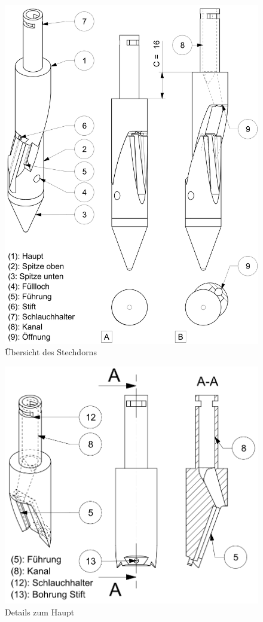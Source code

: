	\begin{figure}[H]
	\includegraphics[scale=0.92]{Illustrationen/6-Umsetzung/details_stechdorn.jpg}
	\caption{Übersicht des Stechdorns}
	\label{fig:details_stechdorn}
	\end{figure}


	\begin{figure}[H]
	\includegraphics[scale=0.62]{Illustrationen/6-Umsetzung/details_haupt.PNG}
	\caption{Details zum Haupt}
	\label{fig:details_haupt}
	\end{figure}

